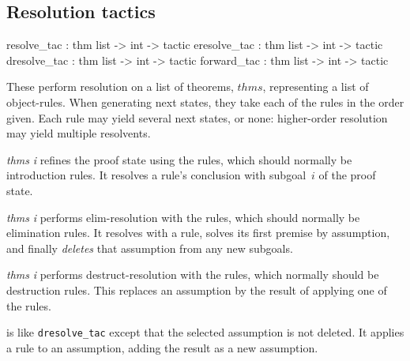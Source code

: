 \subsection{Resolution tactics}
\begin{ttbox} 
resolve_tac  : thm list -> int -> tactic
eresolve_tac : thm list -> int -> tactic
dresolve_tac : thm list -> int -> tactic
forward_tac  : thm list -> int -> tactic 
\end{ttbox}
These perform resolution on a list of theorems, $thms$, representing a list
of object-rules.  When generating next states, they take each of the rules
in the order given.  Each rule may yield several next states, or none:
higher-order resolution may yield multiple resolvents.
\begin{ttdescription}
\item[\ttindexbold{resolve_tac} {\it thms} {\it i}] 
  refines the proof state using the rules, which should normally be
  introduction rules.  It resolves a rule's conclusion with
  subgoal~$i$ of the proof state.

\item[\ttindexbold{eresolve_tac} {\it thms} {\it i}] 
  performs elim-resolution with the rules, which should normally be
  elimination rules.  It resolves with a rule, solves its first premise by
  assumption, and finally {\em deletes\/} that assumption from any new
  subgoals.

\item[\ttindexbold{dresolve_tac} {\it thms} {\it i}] 
  performs destruct-resolution with the rules, which normally should
  be destruction rules.  This replaces an assumption by the result of
  applying one of the rules.

\item[\ttindexbold{forward_tac}]
  is like {\tt dresolve_tac} except that the selected assumption is not
  deleted.  It applies a rule to an assumption, adding the result as a new
  assumption.
\end{ttdescription}

